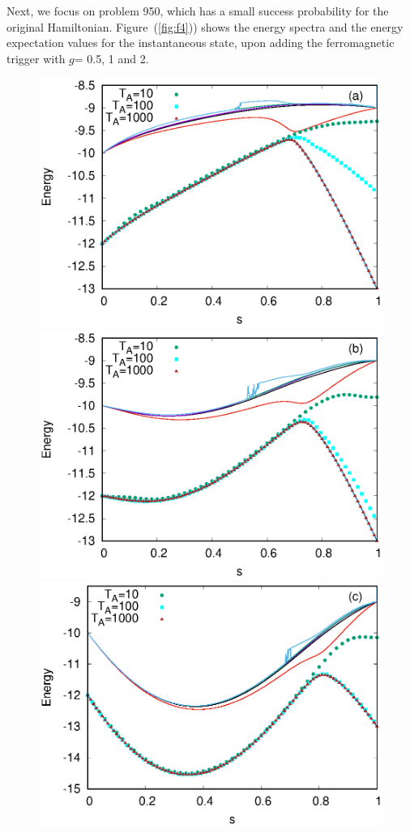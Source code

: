 \documentclass[../main.tex]{subfiles}
\begin{document}
Next, we focus on problem 950, which has a small success probability for the original Hamiltonian. Figure~(\ref{fig:f4})) shows the energy spectra and the energy expectation values for the instantaneous state, upon adding the ferromagnetic trigger with $g$= 0.5, 1 and 2. 
\begin{figure}
\centering 
\includegraphics[scale=0.8]{950_s12_F_g0.eps}
\includegraphics[scale=0.8]{950_s12_F_g1.eps}
\includegraphics[scale=0.8]{950_s12_F_g2.eps}

\end{figure}
\end{document}
